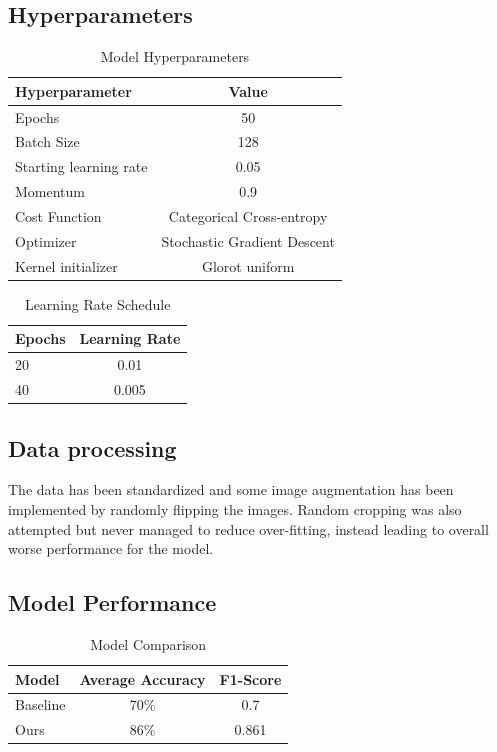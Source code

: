 \documentclass[10pt,twocolumn,letterpaper]{article}
\begin{document}
\subsection{Hyperparameters}
\begin{table}[h!]
\centering
\begin{center}
\begin{tabular}{|l|c|}
\hline
Hyperparameter & Value \\
\hline\hline
Epochs & 50 \\
Batch Size & 128 \\
Starting learning rate & 0.05 \\
Momentum & 0.9 \\
Cost Function & Categorical Cross-entropy\\
Optimizer & Stochastic Gradient Descent\\
Kernel initializer & Glorot uniform\\
\hline
\end{tabular}
\end{center}
\caption{Model Hyperparameters}
\end{table}

\begin{table}[h!]
\centering
\begin{center}
\begin{tabular}{|l|c|}
\hline
Epochs & Learning Rate \\
\hline\hline
20 & 0.01 \\
40 & 0.005 \\
\hline
\end{tabular}
\end{center}
\caption{Learning Rate Schedule}
\end{table}

\subsection{Data processing}
The data has been standardized and some image augmentation has been implemented by randomly flipping the images. Random cropping was also attempted but never managed to reduce over-fitting, instead leading to overall worse performance for the model.

\subsection{Model Performance}

\begin{table}[h!]
\centering
\begin{center}
\begin{tabular}{|l|c|c|}
\hline
Model & Average Accuracy & F1-Score \\
\hline\hline
Baseline & 70\% & 0.7\\
Ours & 86\% & 0.861 \\
\hline
\end{tabular}
\end{center}
\caption{Model Comparison}
\end{table}
\end{document}
